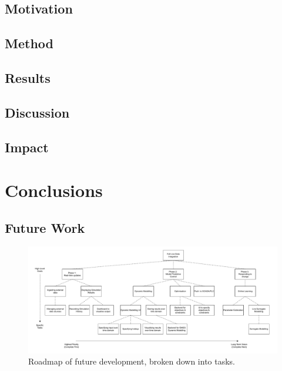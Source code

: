 \documentclass[12pt]{report}
\begin{document}
\section{Motivation}

\section{Method}

\section{Results}

\section{Discussion}



\section{Impact}

\chapter{Conclusions}


\section{Future Work}

\begin{landscape}

    \begin{figure}
        \centering
        \includegraphics[width=1.5\textwidth]{roadmap.pdf}
        \caption{Roadmap of future development, broken down into tasks.}
        \label{fig:development_flowchart}
    \end{figure}
    \end{landscape}
\end{document}
